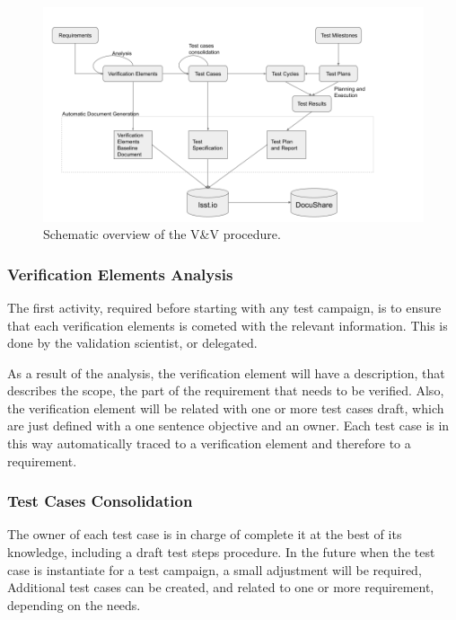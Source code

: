 \begin{figure}
\begin{center}
\includegraphics[width=\textwidth]{imgs/VandVprocedure.png}
 \caption{Schematic overview of the V\&V procedure.}
 \label{fig:vandvtools}
\end{center}
\end{figure}


\subsubsection{Verification Elements Analysis}

The first activity, required before starting with any test campaign, is to ensure that each verification elements is cometed with the relevant information.
This is done by the validation scientist, or delegated.

As a result of the analysis, the verification element will have a description, that describes the scope, the part of the requirement that needs to be verified.
Also, the verification element will be related with one or more test cases draft, which are just defined with a one sentence objective and an owner.
Each test case is in this way automatically traced to a verification element and therefore to a requirement.


\subsubsection{Test Cases Consolidation}

The owner of each test case is in charge of complete it at the best of its knowledge, including a draft test steps procedure.
In the future when the test case is instantiate for a test campaign, a small adjustment will be required,
Additional test cases can be created, and related to one or more requirement, depending on the needs.


